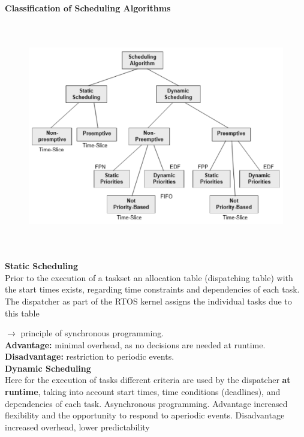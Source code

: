 {\rot\bf Classification of Scheduling Algorithms}

	\begin{figure}[h]
    \centering
    \includegraphics[width=15cm, height=10cm]{Images/image88.png}
    \label{fig:Fig 33}
    \end{figure}
    
{\rot\bf Static Scheduling}\\

Prior to the execution of a taskset an allocation table (dispatching table) with the start times exists, regarding time constraints and dependencies of each task. The dispatcher as part of the RTOS kernel assigns the individual tasks due to this table 

$\rightarrow$ principle of synchronous programming.\\

\textbf{Advantage: }  minimal overhead, as no decisions are needed at runtime. \\

\textbf{Disadvantage: }  restriction to periodic events.\\

{\rot\bf Dynamic Scheduling}\\

Here for the execution of tasks different criteria are used by the dispatcher \textbf{at runtime}, taking into account start times, time conditions (deadlines), and dependencies of each task. Asynchronous programming. Advantage  increased flexibility and the opportunity to respond to aperiodic events. Disadvantage  increased overhead, lower predictability\\


